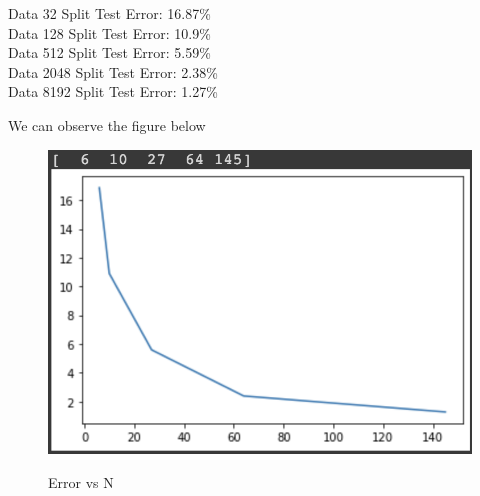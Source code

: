 \documentclass[a4paper]{article}
\theoremstyle{definition}
\newenvironment{soln}{
    \leavevmode\color{blue}\ignorespaces
}{}
\begin{document}
\begin{enumerate}
\begin{soln}
\begin{center}
      Data 32 Split Test Error: 16.87\%\\
      Data 128 Split Test Error: 10.9\%\\
      Data 512 Split Test Error: 5.59\%\\
      Data 2048 Split Test Error: 2.38\%\\
      Data 8192 Split Test Error: 1.27\%\\
        \end{center}
      We can observe the figure below
        \begin{figure}[H]
            \centering
            \includegraphics[scale=0.5]{error.png}
            \label{fig:q2}
            \caption{Error vs N}
        \end{figure} 
    

\end{soln}
\end{enumerate}
\end{document}
